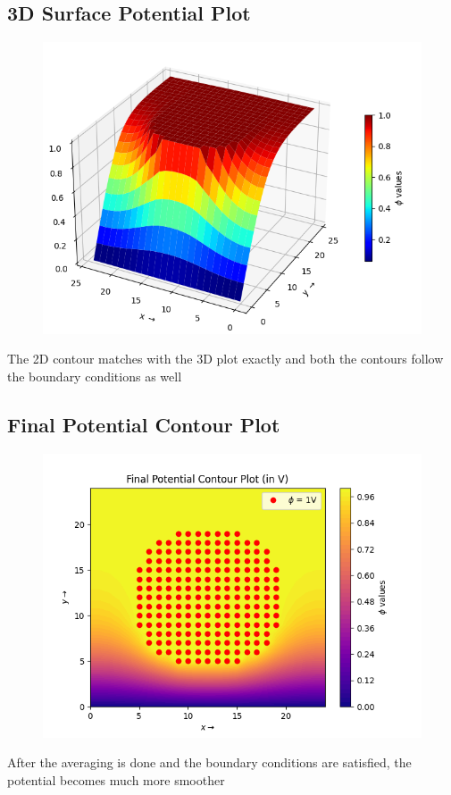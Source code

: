 \documentclass[12pt, a4paper]{article}
\begin{document}
\subsection{3D Surface Potential Plot}
\vspace*{-0.5cm}
\begin{figure}[H]
    \centering
    \includegraphics[scale = 0.75]{Figure_4.png}
    \label{fig:sample}
\end{figure}
\vspace*{-0.5cm}
\begin{center}
    The 2D contour matches with the 3D plot exactly and both the contours
follow the boundary conditions as well
\end{center}
\subsection{Final Potential Contour Plot}
\vspace*{-0.5cm}
\begin{figure}[H]
    \centering
    \includegraphics[scale = 0.75]{Figure_5.png}
    \label{fig:sample}
\end{figure}
\vspace*{-0.5cm}
\begin{center}
    After the averaging is done and the boundary conditions are satisfied, the
potential becomes much more smoother
\end{center}
\end{document}
